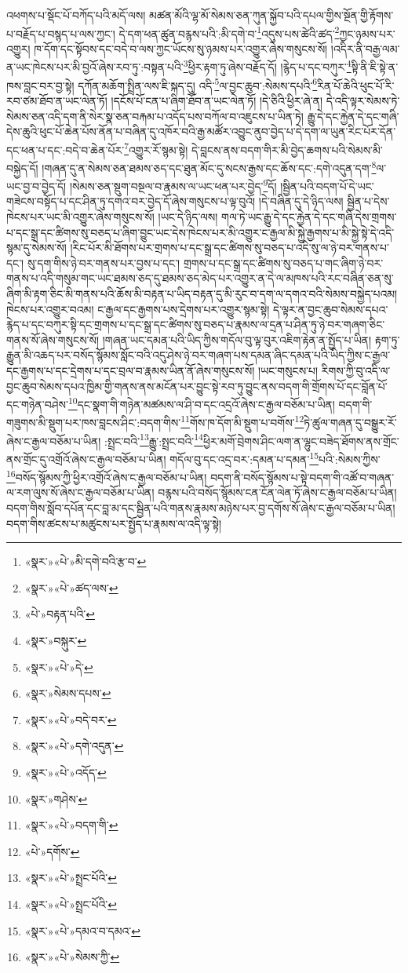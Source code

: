 འཕགས་པ་སྡོང་པོ་བཀོད་པའི་མདོ་ལས། མཚན་མོའི་ལྷ་མོ་སེམས་ཅན་ཀུན་སྐྱོབ་པའི་དཔལ་གྱིས་སྔོན་གྱི་རྟོགས་པ་བརྗོད་པ་བསྙད་པ་ལས་ཀྱང་། དེ་དག་ཕན་ཚུན་བརྙས་པའི་:མི་དགེ་བ་\footnote{«སྣར་»«པེ་»མི་དགེ་བའི་རྩ་བ་}འདུས་པས་ཚེའི་ཚད་\footnote{«སྣར་»«པེ་»ཚད་ལས་}ཀྱང་ཉམས་པར་འགྱུར། ཁ་དོག་དང་སྟོབས་དང་བདེ་བ་ལས་ཀྱང་ཡོངས་སུ་ཉམས་པར་འགྱུར་ཞེས་གསུངས་སོ། །འདིར་ནི་བརྒྱ་ལམ་ན་ཡང་ཁེངས་པར་མི་བྱའོ་ཞེས་རབ་ཏུ་:བསྟན་པའི་\footnote{«པེ་»བརྟན་པའི་}ཕྱིར་རྟག་ཏུ་ཞེས་བརྗོད་དོ། །རྙེད་པ་དང་བཀུར་\footnote{«སྣར་»བསྐུར་}སྟི་ནི་ཇི་སྟེ་ན་ཁས་བླང་བར་བྱ་སྟེ། དཀོན་མཆོག་སྤྲིན་ལས་ཇི་སྐད་དུ། འདི་\footnote{«སྣར་»«པེ་»དེ་}ལ་བྱང་ཆུབ་:སེམས་དཔའི་\footnote{«སྣར་»སེམས་དཔས་}རིན་པོ་ཆེའི་ཕུང་པོ་རི་རབ་ཙམ་ཐོབ་ན་ཡང་ལེན་ཏོ། །དངོས་པོ་ངན་པ་ཞིག་ཐོབ་ན་ཡང་ལེན་ཏོ། །དེ་ཅིའི་ཕྱིར་ཞེ་ན། དེ་འདི་ལྟར་སེམས་ཏེ་སེམས་ཅན་འདི་དག་ནི་སེར་སྣ་ཅན་བརྐམ་པ་འདོད་པས་བཀོལ་བ་འཇུངས་པ་ཡིན་ཏེ། རྒྱུ་དེ་དང་རྐྱེན་དེ་དང་གཞི་དེས་ཆུའི་ཕུང་པོ་ཆེན་པོས་ནོན་པ་བཞིན་དུ་འཁོར་བའི་རྒྱ་མཚོར་འབྱུང་ནུབ་བྱེད་པ་དེ་དག་ལ་ཡུན་རིང་པོར་དོན་དང་ཕན་པ་དང་:བདེ་བ་ཆེན་པོར་\footnote{«སྣར་»«པེ་»བདེ་བར་}འགྱུར་རོ་སྙམ་སྟེ། དེ་བླངས་ནས་བདག་གིར་མི་བྱེད་ཆགས་པའི་སེམས་མི་བསྐྱེད་དོ། །གཞན་དུ་ན་སེམས་ཅན་ཐམས་ཅད་དང་ཐུན་མོང་དུ་སངས་རྒྱས་དང་ཆོས་དང་:དགེ་འདུན་དག་\footnote{«སྣར་»«པེ་»དགེ་འདུན་}ལ་ཡང་བྱ་བ་བྱེད་དོ། །སེམས་ཅན་སྡུག་བསྔལ་བ་རྣམས་ལ་ཡང་ཕན་པར་བྱེད་\footnote{«སྣར་»«པེ་»འདོད་}དོ། །སྦྱིན་པའི་བདག་པོ་དེ་ཡང་གཟེངས་བསྟོད་པ་དང་ཤིན་ཏུ་དགའ་བར་བྱེད་དོ་ཞེས་གསུངས་པ་ལྟ་བུའོ། །དེ་བཞིན་དུ་དེ་ཉིད་ལས། སྦྱིན་པ་དེས་ཁེངས་པར་ཡང་མི་འགྱུར་ཞེས་གསུངས་སོ། །ཡང་དེ་ཉིད་ལས། གལ་ཏེ་ཡང་རྒྱུ་དེ་དང་རྐྱེན་དེ་དང་གཞི་དེས་གྲགས་པ་དང་སྒྲ་དང་ཚིགས་སུ་བཅད་པ་ཞིག་བྱུང་ཡང་དེས་ཁེངས་པར་མི་འགྱུར་ང་རྒྱལ་མི་སྐྱེ་རྒྱགས་པ་མི་སྐྱེ་སྟེ་དེ་འདི་སྙམ་དུ་སེམས་སོ། །རིང་པོར་མི་ཐོགས་པར་གྲགས་པ་དང་སྒྲ་དང་ཚིགས་སུ་བཅད་པ་འདི་སུ་ལ་ཉེ་བར་གནས་པ་དང་། སུ་དག་གིས་ཉེ་བར་གནས་པར་བྱས་པ་དང་། གྲགས་པ་དང་སྒྲ་དང་ཚིགས་སུ་བཅད་པ་གང་ཞིག་ཉེ་བར་གནས་པ་འདི་གསུམ་གང་ཡང་ཐམས་ཅད་དུ་ཐམས་ཅད་མེད་པར་འགྱུར་ན་དེ་ལ་མཁས་པའི་རང་བཞིན་ཅན་སུ་ཞིག་མི་རྟག་ཅིང་མི་གནས་པའི་ཆོས་མི་བརྟན་པ་ཡིད་བརྟན་དུ་མི་རུང་བ་དག་ལ་དགའ་བའི་སེམས་བསྐྱེད་པའམ། ཁེངས་པར་འགྱུར་བའམ། ང་རྒྱལ་དང་རྒྱགས་པས་དྲེགས་པར་འགྱུར་སྙམ་སྟེ། དེ་ལྟར་ན་བྱང་ཆུབ་སེམས་དཔའ་རྙེད་པ་དང་བཀུར་སྟི་དང་གྲགས་པ་དང་སྒྲ་དང་ཚིགས་སུ་བཅད་པ་རྣམས་ལ་དྲན་པ་ཤིན་ཏུ་ཉེ་བར་གཞག་ཅིང་གནས་སོ་ཞེས་གསུངས་སོ། །གཞན་ཡང་དམན་པའི་ཡིད་ཀྱིས་གདོལ་བུ་ལྟ་བུར་འཇིག་རྟེན་ན་སྤྱོད་པ་ཡིན། རྟག་ཏུ་རྒྱུན་མི་འཆད་པར་བསོད་སྙོམས་སློང་བའི་འདུ་ཤེས་ཉེ་བར་གཞག་པས་དམན་ཞིང་དམན་པའི་ཡིད་ཀྱིས་ང་རྒྱལ་དང་རྒྱགས་པ་དང་དྲེགས་པ་དང་བྲལ་བ་རྣམས་ཡིན་ནོ་ཞེས་གསུངས་སོ། །ཡང་གསུངས་པ། རིགས་ཀྱི་བུ་འདི་ལ་བྱང་ཆུབ་སེམས་དཔའ་ཁྱིམ་གྱི་གནས་ནས་མངོན་པར་བྱུང་སྟེ་རབ་ཏུ་བྱུང་ནས་བདག་གི་གྲོགས་པོ་དང་བློན་པོ་དང་གཉེན་བཤེས་\footnote{«སྣར་»གཤེས་}དང་སྣག་གི་གཉེན་མཚམས་ལ་ཤི་བ་དང་འདྲའོ་ཞེས་ང་རྒྱལ་བཅོམ་པ་ཡིན། བདག་གི་གཟུགས་མི་སྡུག་པར་ཁས་བླངས་ཤིང་:བདག་གིས་\footnote{«སྣར་»«པེ་»བདག་གི་}གོས་ཁ་དོག་མི་སྡུག་པ་བགོས་\footnote{«པེ་»དགོས་}ཏེ་ཚུལ་གཞན་དུ་བསྒྱུར་རོ་ཞེས་ང་རྒྱལ་བཅོམ་པ་ཡིན། :སྤྲང་བའི་\footnote{«སྣར་»«པེ་»སྤྲང་པོའི་}རྒྱུ་:སྤྲང་བའི་\footnote{«སྣར་»«པེ་»སྤྲང་པོའི་}ཕྱིར་མགོ་བྲེགས་ཤིང་ལག་ན་ལྷུང་བཟེད་ཐོགས་ནས་གྲོང་ནས་གྲོང་དུ་འགྲོའོ་ཞེས་ང་རྒྱལ་བཅོམ་པ་ཡིན། གདོལ་བུ་དང་འདྲ་བར་:དམན་པ་དམན་\footnote{«སྣར་»«པེ་»དམའ་བ་དམའ་}པའི་:སེམས་ཀྱིས་\footnote{«སྣར་»«པེ་»སེམས་ཀྱི་}བསོད་སྙོམས་ཀྱི་ཕྱིར་འགྲོའོ་ཞེས་ང་རྒྱལ་བཅོམ་པ་ཡིན། བདག་ནི་བསོད་སྙོམས་པ་སྟེ་བདག་གི་འཚོ་བ་གཞན་ལ་རག་ལུས་སོ་ཞེས་ང་རྒྱལ་བཅོམ་པ་ཡིན། བརྙས་པའི་བསོད་སྙོམས་ངན་ངོན་ལེན་ཏོ་ཞེས་ང་རྒྱལ་བཅོམ་པ་ཡིན། བདག་གིས་སློབ་དཔོན་དང་བླ་མ་དང་སྦྱིན་པའི་གནས་རྣམས་མཉེས་པར་བྱ་དགོས་སོ་ཞེས་ང་རྒྱལ་བཅོམ་པ་ཡིན། བདག་གིས་ཚངས་པ་མཚུངས་པར་སྤྱོད་པ་རྣམས་ལ་འདི་ལྟ་སྟེ། 